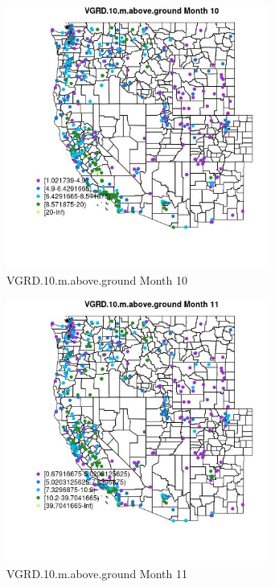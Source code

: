 \begin{figure} 
\centering  
\includegraphics[width=0.77\textwidth]{Code_Outputs/ML_input_report_ML_input_PM25_Step5_part_d_de_duplicated_aves_ML_input_MapObsMo10VGRD10maboveground.jpg} 
\caption{\label{fig:ML_input_report_ML_input_PM25_Step5_part_d_de_duplicated_aves_ML_inputMapObsMo10VGRD10maboveground}VGRD.10.m.above.ground Month 10} 
\end{figure} 
 

\begin{figure} 
\centering  
\includegraphics[width=0.77\textwidth]{Code_Outputs/ML_input_report_ML_input_PM25_Step5_part_d_de_duplicated_aves_ML_input_MapObsMo11VGRD10maboveground.jpg} 
\caption{\label{fig:ML_input_report_ML_input_PM25_Step5_part_d_de_duplicated_aves_ML_inputMapObsMo11VGRD10maboveground}VGRD.10.m.above.ground Month 11} 
\end{figure} 
 

